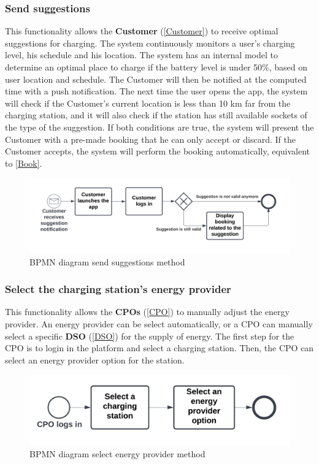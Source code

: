 \subsubsection{Send suggestions}
This functionality allows the \textbf{Customer} (\ref{Customer}) to receive optimal suggestions for charging.
The system continuously monitors a user's charging level, his schedule and his location.
The system has an internal model to determine an optimal place to charge if the battery level is under 50\%, based on user location and schedule.
The Customer will then be notified at the computed time with a push notification. The next time the user opens the app, the system will check if the Customer's current location is less than 10 km far from the charging station, and it will also check if the station has still available sockets of the type of the suggestion. If both conditions are true, the system will present the Customer with a pre-made booking that he can only accept or discard. If the Customer accepts, the system will perform the booking automatically, equivalent to \ref{Book}. 
\begin{figure}[H]
    \begin{center}
        \includegraphics[width=\textwidth]{img/fun-sug.png}
        \caption{BPMN diagram send suggestions method}
    \end{center}
\end{figure}
\subsubsection{Select the charging station's energy provider}
This functionality allows the \textbf{CPOs} (\ref{CPO}) to manually adjust the energy provider. An energy provider can be select automatically, or a CPO can manually select a specific \textbf{DSO} (\ref{DSO}) for the supply of energy. The first step for the CPO is to login in the platform and select a charging station. Then, the CPO can select an energy provider option for the station.
\begin{figure}[H]
    \begin{center}
        \includegraphics[width=\textwidth]{img/fun-en-prov.png}
        \caption{BPMN diagram select energy provider method}
    \end{center}
\end{figure}
